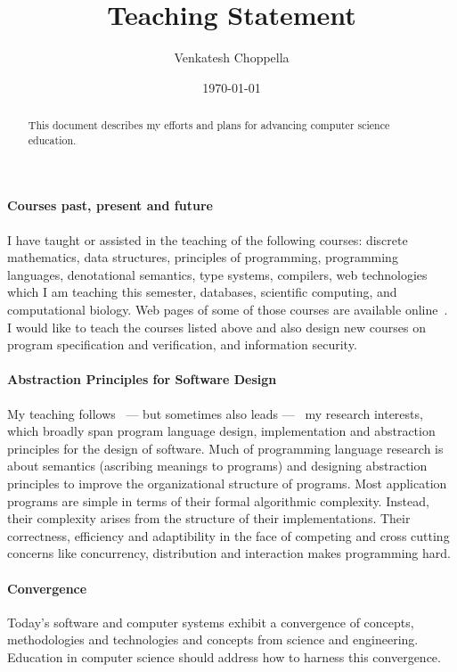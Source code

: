 \documentclass[
9pt, 
]{article}
\begin{document}
\title{Teaching Statement}
\author{Venkatesh Choppella}
\date{\today}
\maketitle

\begin{abstract}
  This document describes my efforts and plans for advancing
  computer science education.
\end{abstract}

\paragraph{Courses  past, present and future}
I have taught or assisted in the teaching of the following
courses: discrete mathematics, data structures, principles
of programming, programming languages, denotational
semantics, type systems, compilers, web technologies which I
am teaching this semester, databases, scientific computing,
and computational biology.  Web pages of some of those
courses are available online~\cite{choppella-courses}.  I
would like to teach the courses listed above and also design
new courses on program specification and verification, and
information security.

\paragraph{Abstraction Principles for Software Design}
My teaching follows \  --- but sometimes also leads --- \  my
research interests, which broadly span program language
design, implementation and abstraction principles for the
design of software.  Much of programming language research
is about semantics (ascribing meanings to programs) and
designing abstraction principles to improve the
organizational structure of programs.  Most application
programs are simple in terms of their formal algorithmic
complexity.  Instead, their complexity arises from the
structure of their implementations.  Their correctness,
efficiency and adaptibility in the face of competing and
cross cutting concerns like concurrency, distribution and
interaction makes programming hard.

\paragraph{Convergence} 
Today's software and computer systems exhibit a convergence
of concepts, methodologies and technologies and concepts
from science and engineering.  Education in computer science
should address how to harness this convergence.
\end{document}
